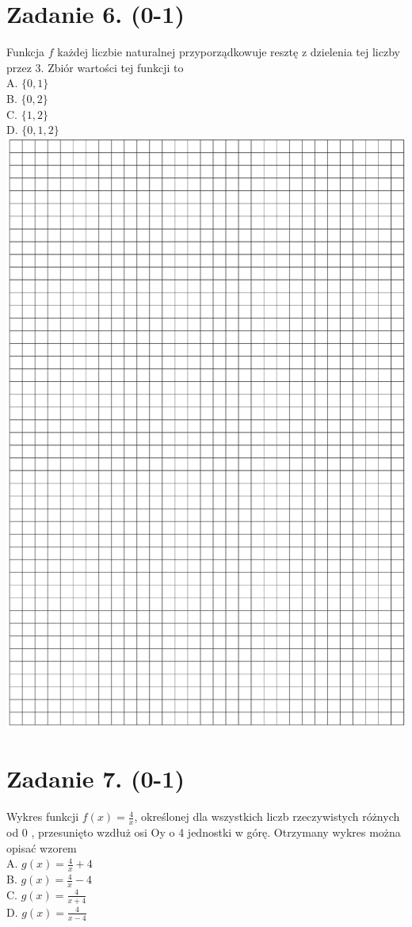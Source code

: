 \documentclass[10pt]{article}
\begin{document}
\section*{Zadanie 6. (0-1)}
Funkcja \(f\) każdej liczbie naturalnej przyporządkowuje resztę z dzielenia tej liczby przez 3. Zbiór wartości tej funkcji to\\
A. \(\{0,1\}\)\\
B. \(\{0,2\}\)\\
C. \(\{1,2\}\)\\
D. \(\{0,1,2\}\)\\
\includegraphics[max width=\textwidth, center]{2024_11_21_dd21f7544b65bcf1b3c7g-03}

\section*{Zadanie 7. (0-1)}
Wykres funkcji \(f(x)=\frac{4}{x}\), określonej dla wszystkich liczb rzeczywistych różnych od 0 , przesunięto wzdłuż osi Oy o 4 jednostki w górę. Otrzymany wykres można opisać wzorem\\
A. \(g(x)=\frac{4}{x}+4\)\\
B. \(g(x)=\frac{4}{x}-4\)\\
C. \(g(x)=\frac{4}{x+4}\)\\
D. \(g(x)=\frac{4}{x-4}\)
\end{document}
